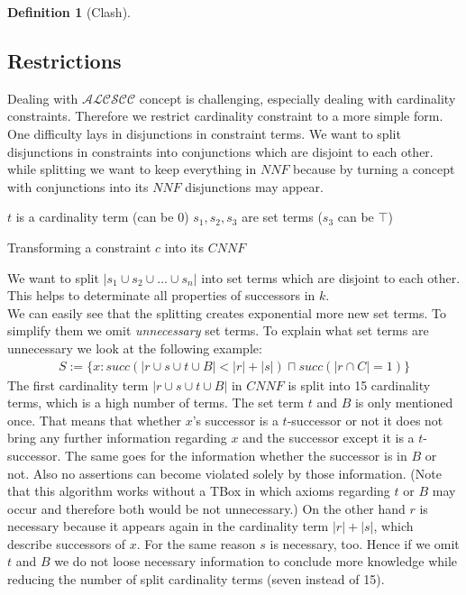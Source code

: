 \documentclass[a4paper,11pt]{scrartcl}
\theoremstyle{break}
\theoremstyle{definition}
\newtheorem{mydef}{Definition}
\begin{document}
\begin{mydef}[Clash]
\subsection{Restrictions}
Dealing with $\mathcal{ALCSCC}$ concept is challenging, especially dealing with cardinality constraints. Therefore we restrict cardinality constraint to a more simple form. One difficulty lays in disjunctions in constraint terms. We want to split disjunctions in constraints into conjunctions which are disjoint to each other. while splitting we want to keep everything in $NNF$ because by turning a concept with conjunctions into its $NNF$ disjunctions may appear.\\
\begin{algorithm}[H]
	$t$ is a cardinality term (can be 0)\;
	$s_1,s_2,s_3$ are set terms ($s_3$ can be $\top$)\;
    \caption{Transforming a constraint $c$ into its $CNNF$}
\end{algorithm}
We want to split $|s_1\cup s_2\cup\dots \cup s_n|$ into set terms which are disjoint to each other. This helps to determinate all properties of successors in $k$.\\
We can easily see that the splitting creates exponential more new set terms. To simplify them we omit \textit{unnecessary} set terms. To explain what set terms are unnecessary we look at the following example:
\begin{align*}
S:=\{x:succ(|r\cup s\cup t\cup B|<|r|+|s|)\sqcap succ(|r\cap C|=1)\}
\end{align*}
The first cardinality term $|r\cup s\cup t\cup B|$ in $CNNF$ is split into 15 cardinality terms, which is a high number of terms. The set term $t$ and $B$ is only mentioned once. That means that whether $x$'s successor is a $t$-successor or not it does not bring any further information regarding $x$ and the successor except it is a $t$-successor. The same goes for the information whether the successor is in $B$ or not. Also no assertions can become violated solely by those information. (Note that this algorithm works without a TBox in which axioms regarding $t$ or $B$ may occur and therefore both would be not unnecessary.) On the other hand $r$ is necessary because it appears again in the cardinality term $|r|+|s|$, which describe successors of $x$. For the same reason $s$ is necessary, too. Hence if we omit $t$ and $B$ we do not loose necessary information to conclude more knowledge while reducing the number of split cardinality terms (seven instead of 15).

\end{mydef}
\end{document}
